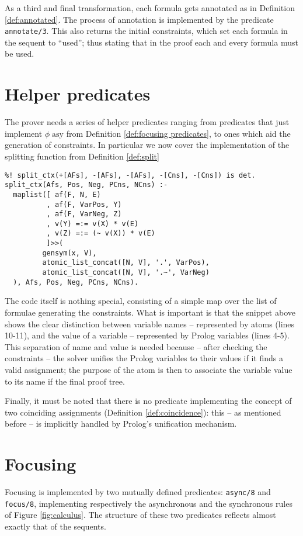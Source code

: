 As a third and final transformation, each formula gets annotated as in Definition \ref{def:annotated}.
The process of annotation is implemented by the predicate \texttt{annotate/3}.
This also returns the initial constraints, which set each formula in the sequent to ``used''; thus stating that in the proof each and every formula must be used.

\section{Helper predicates}\label{sec:helper}
The prover needs a series of helper predicates ranging from predicates that just implement $\phi\;\mathrm{asy}$ from Definition \ref{def:focusing predicates}, to ones which aid the generation of constraints.
In particular we now cover the implementation of the splitting function from Definition \ref{def:split}
\begin{verbatim}
%! split_ctx(+[AFs], -[AFs], -[AFs], -[Cns], -[Cns]) is det.
split_ctx(Afs, Pos, Neg, PCns, NCns) :-
  maplist([ af(F, N, E)
          , af(F, VarPos, Y)
          , af(F, VarNeg, Z)
          , v(Y) =:= v(X) * v(E)
          , v(Z) =:= (~ v(X)) * v(E)
          ]>>(
  	     gensym(x, V),
  	     atomic_list_concat([N, V], '.', VarPos),
  	     atomic_list_concat([N, V], '.~', VarNeg)
  ), Afs, Pos, Neg, PCns, NCns).
\end{verbatim}
The code itself is nothing special, consisting of a simple map over the list of formulae generating the constraints.
What is important is that the snippet above shows the clear distinction between variable names -- represented by atoms (lines 10-11), and the value of a variable -- represented by Prolog variables (lines 4-5).
This separation of name and value is needed because -- after checking the constraints -- the solver unifies the Prolog variables to their values if it finds a valid assignment; the purpose of the atom is then to associate the variable value to its name if the final proof tree.

Finally, it must be noted that there is no predicate implementing the concept of two coinciding assignments (Definition \ref{def:coincidence}): this -- as mentioned before -- is implicitly handled by Prolog's unification mechanism.

\section{Focusing}\label{sec:focusing impl}
Focusing is implemented by two mutually defined predicates: \texttt{async/8} and \texttt{focus/8}, implementing respectively the asynchronous and the synchronous rules of Figure \ref{fig:calculus}.
The structure of these two predicates reflects almost exactly that of the sequents.

